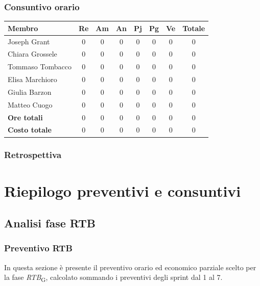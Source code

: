 \documentclass[11pt,a4paper]{article}
\begin{document}
\subsubsection{Consuntivo orario}
\begin{center}
    \begin{tabular}{|l|c|c|c|c|c|c|c|}
        \hline
        \textbf{Membro} & \textbf{Re} & \textbf{Am} & \textbf{An} & \textbf{Pj} & \textbf{Pg} & \textbf{Ve} & \textbf{Totale} \\
        \hline
        Joseph Grant & 0 & 0 & 0 & 0 & 0 & 0 & 0 \\
        \hline
        Chiara Grossele & 0 & 0 & 0 & 0 & 0 & 0 & 0 \\
        \hline
        Tommaso Tombacco & 0 & 0 & 0 & 0 & 0 & 0 & 0 \\
        \hline
        Elisa Marchioro & 0 & 0 & 0 & 0 & 0 & 0 & 0 \\
        \hline
        Giulia Barzon & 0 & 0 & 0 & 0 & 0 & 0 & 0 \\
        \hline
        Matteo Cuogo & 0 & 0 & 0 & 0 & 0 & 0 & 0 \\
        \hline
        \textbf{Ore totali} & 0 & 0 & 0 & 0 & 0 & 0 & 0 \\
        \hline
        \textbf{Costo totale} & 0 & 0 & 0 & 0 & 0 & 0 & 0 \\
        \hline
    \end{tabular}
\end{center}

\subsubsection{Retrospettiva}

\newpage
\section{Riepilogo preventivi e consuntivi}

\subsection{Analisi fase RTB}

\subsubsection{Preventivo RTB}
In questa sezione è presente il preventivo orario ed economico parziale scelto per la fase \textit{RTB}\textsubscript{G}, calcolato sommando i preventivi degli sprint dal 1 al 7.
\end{document}
